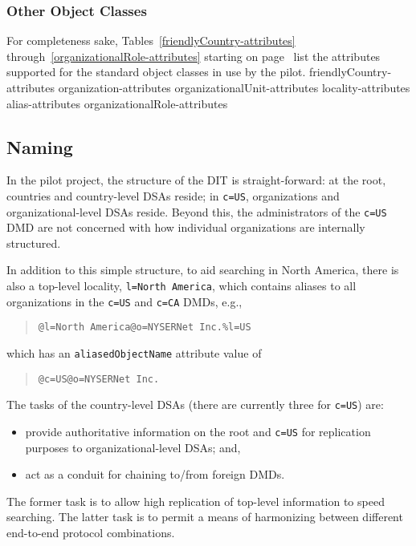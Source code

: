 \subsubsection	{Other Object Classes}
For completeness sake,
Tables~\ref{friendlyCountry-attributes}
through~\ref{organizationalRole-attributes} starting on
page~\pageref{friendlyCountry-attributes} list the attributes supported for
the standard object classes in use by the pilot.
%
	{friendlyCountry-attributes}
%
	{organization-attributes}
%
	{organizationalUnit-attributes}
%
	{locality-attributes}
%
	{alias-attributes}
%
	{organizationalRole-attributes}

\subsection	{Naming}
In the pilot project,
the structure of the DIT is straight-forward:
at the root,
countries and country-level DSAs reside;
in \verb"c=US",
organizations and organizational-level DSAs reside.
Beyond this,
the administrators of the \verb"c=US" DMD are not concerned with how
individual organizations are internally structured.

In addition to this simple structure,
to aid searching in North America,
there is also a top-level locality,
\verb"l=North America",
which contains aliases to all organizations in the \verb"c=US" and \verb"c=CA"
DMDs,
e.g.,
\begin{quote}\small\begin{verbatim}
@l=North America@o=NYSERNet Inc.%l=US
\end{verbatim}\end{quote}
which has an \verb"aliasedObjectName" attribute value of
\begin{quote}\small\begin{verbatim}
@c=US@o=NYSERNet Inc.
\end{verbatim}\end{quote}

The tasks of the country-level DSAs
(there are currently three for \verb"c=US")
are:
\begin{itemize}
\item	provide authoritative information on the root and \verb"c=US"
	for replication purposes to organizational-level DSAs;
	and,

\item	act as a conduit for chaining to/from foreign DMDs.
\end{itemize}
The former task is to allow high replication of top-level information to speed
searching.
The latter task is to permit a means of harmonizing between different
end-to-end protocol combinations.

